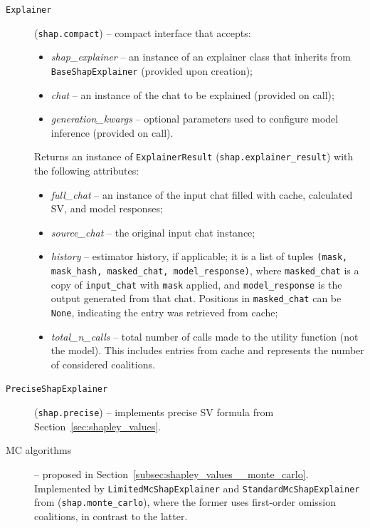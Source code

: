 \begin{appendices}
\begin{description}
    \item[\texttt{Explainer}] (\texttt{shap.compact}) -- compact interface that accepts:
        \begin{itemize}
            \item \textit{shap\_explainer} -- an instance of an explainer class that inherits from \texttt{BaseShapExplainer} (provided upon creation);
            \item \textit{chat} -- an instance of the chat to be explained (provided on call);
            \item \textit{generation\_kwargs} -- optional parameters used to configure model inference (provided on call).
        \end{itemize}

    Returns an instance of \texttt{ExplainerResult} (\texttt{shap.explainer\_result}) with the following attributes:
        \begin{itemize}
            \item \textit{full\_chat} -- an instance of the input chat filled with cache, calculated SV, and model responses;
            \item \textit{source\_chat} -- the original input chat instance;
            \item \textit{history} -- estimator history, if applicable; it is a list of tuples \texttt{(mask, mask\_hash, masked\_chat, model\_response)}, where \texttt{masked\_chat} is a copy of \texttt{input\_chat} with \texttt{mask} applied, and \texttt{model\_response} is the output generated from that chat. Positions in \texttt{masked\_chat} can be \texttt{None}, indicating the entry was retrieved from cache;
            \item \textit{total\_n\_calls} -- total number of calls made to the utility function (not the model). This includes entries from cache and represents the number of considered coalitions.
        \end{itemize}

    \item[\texttt{PreciseShapExplainer}] (\texttt{shap.precise}) -- implements precise SV formula from Section~\ref{sec:shapley_values}.

    \item[MC algorithms] -- proposed in Section~\ref{subsec:shapley_values__monte_carlo}. Implemented by \texttt{LimitedMcShapExplainer} and \texttt{StandardMcShapExplainer} from (\texttt{shap.monte\_carlo}), where the former uses first-order omission coalitions, in contrast to the latter.


\end{description}
\end{appendices}
